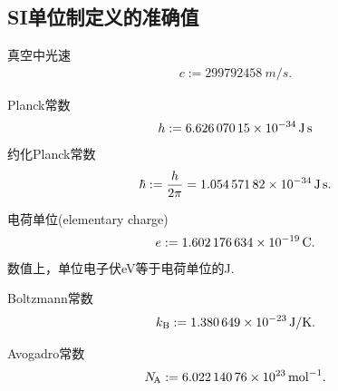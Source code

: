 \subsection{SI单位制定义的准确值}
\begin{compactitem}
	\item 真空中光速
		\begin{align}
			c:=\SI{299792458}{m/s}.
		\end{align}
	\item Planck常数
		\begin{align}
			h:=\SI{6.62607015E-34}{J.s}
		\end{align}
		约化Planck常数
		\begin{align}
			\hbar:=\frac{h}{2\pi}=\SI{1.05457182E-34}{J.s}.
		\end{align}
	\item 电荷单位(elementary charge)
		\begin{align}
			e:=\SI{1.602176634E-19}{C}.
		\end{align}
		数值上，单位电子伏eV等于电荷单位的J.
	\item Boltzmann常数
		\begin{align}
			k_{\mathrm B}:=\SI{1.380649E-23}{J/K}.
		\end{align}
	\item Avogadro常数
		\begin{align}
			N_{\hspace{-1 pt}\mathrm A}:=\SI{6.02214076E23}{mol^{-1}}.
		\end{align}
\end{compactitem}
